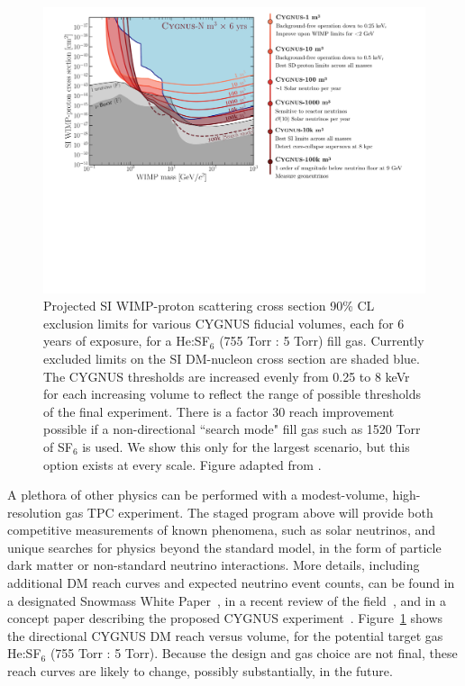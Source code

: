 \begin{figure}[!htbp]
\begin{center}
\includegraphics[width=0.99\columnwidth]{figures/Cygnus_listed_timeline.pdf}
\caption{Projected SI WIMP-proton scattering cross section 90\% CL exclusion limits for various CYGNUS fiducial volumes, each for 6 years of exposure, for a He:SF$_6$ (755 Torr : 5 Torr) fill gas. Currently excluded limits on the SI DM-nucleon cross section are shaded blue. The CYGNUS thresholds are increased evenly from 0.25 to 8 keVr for each increasing volume to reflect the range of possible thresholds of the final experiment. There is a factor 30 reach improvement possible if a non-directional ``search mode" fill gas such as 1520 Torr of SF$_6$ is used. We show this only for the largest scenario, but this option exists at every scale. Figure adapted from \cite{Vahsen:2020pzb}.\label{cygnus_timeline}}
\end{center}
\end{figure}

A plethora of other physics can be performed with a modest-volume, high-resolution gas TPC experiment. The staged program above will provide both competitive measurements of known phenomena, such as solar neutrinos, and unique searches for physics beyond the standard model, in the form of particle dark matter or non-standard neutrino interactions.  More details, including additional DM reach curves and expected neutrino event counts, can be found in a designated Snowmass White Paper~\cite{SnowmassIF53}, in a recent review of the field~\cite{Vahsen:2021gnb}, and in a concept paper describing the proposed CYGNUS experiment~\cite{Vahsen:2020pzb}. Figure~\ref{cygnus_timeline} shows the directional CYGNUS DM reach versus volume, for the potential target gas He:SF$_6$ (755 Torr : 5 Torr). Because the design and gas choice are not final, these reach curves are likely to change, possibly substantially, in the future.


